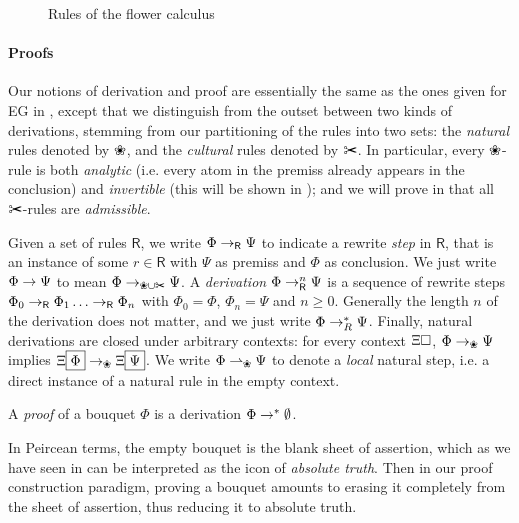 \begin{figure*}[h!]
  
  \caption{Rules of the flower calculus}
\end{figure*}

\paragraph{Proofs}

Our notions of derivation and proof are essentially the same as the ones given
for EG in , except that we distinguish from the outset between
two kinds of derivations, stemming from our partitioning of the rules into two
sets: the \emph{natural} rules denoted by $\Nature$, and the \emph{cultural}
rules denoted by $\Culture$. In particular, every $\Nature$-rule is both
\emph{analytic} (i.e. every atom in the premiss already appears in the
conclusion) and \emph{invertible} (this will be shown in );
and we will prove in  that all $\Culture$-rules are
\emph{admissible}.

\begin{definition}[Derivation]
  Given a set of rules $\mathsf{R}$, we write $\Phi \rightarrow_{\mathsf{R}} \Psi$ to
  indicate a rewrite \emph{step} in $\mathsf{R}$, that is an instance of some $r
  \in \mathsf{R}$ with $\Psi$ as premiss and $\Phi$ as conclusion. We just write
  $\Phi \rightarrow \Psi$ to mean $\Phi \step_{\Nature\cup\Culture} \Psi$. A
  \emph{derivation} $\Phi \rightarrow^{n}_{\mathsf{R}} \Psi$ is a sequence of rewrite
  steps $\Phi_0 \rightarrow_{\mathsf{R}} \Phi_1 \ldots \rightarrow_{\mathsf{R}} \Phi_n$ with
  $\Phi_0 = \Phi$, $\Phi_n = \Psi$ and $n \geq 0$. Generally the length $n$ of
  the derivation does not matter, and we just write $\Phi \rightarrow^\ast_R \Psi$.
  Finally, natural derivations are closed under arbitrary contexts: for every
  context $\Xi\square$, $\Phi \step_\Nature \Psi$ implies $\cfill{\Xi}{\Phi}
  \step_\Nature \cfill{\Xi}{\Psi}$. We write $\Phi \lstep_{\Nature} \Psi$ to
  denote a \emph{local} natural step, i.e. a direct instance of a natural rule
  in the empty context.
\end{definition}

\begin{definition}[Proof]
  A \emph{proof} of a bouquet $\Phi$ is a derivation $\Phi \rightarrow^\ast \emptyset$.
\end{definition}

In Peircean terms, the empty bouquet is the blank sheet of assertion, which as
we have seen in  can be interpreted as the icon of \emph{absolute
truth}. Then in our proof construction paradigm, proving a bouquet amounts to
erasing it completely from the sheet of assertion, thus reducing it to absolute
truth.

